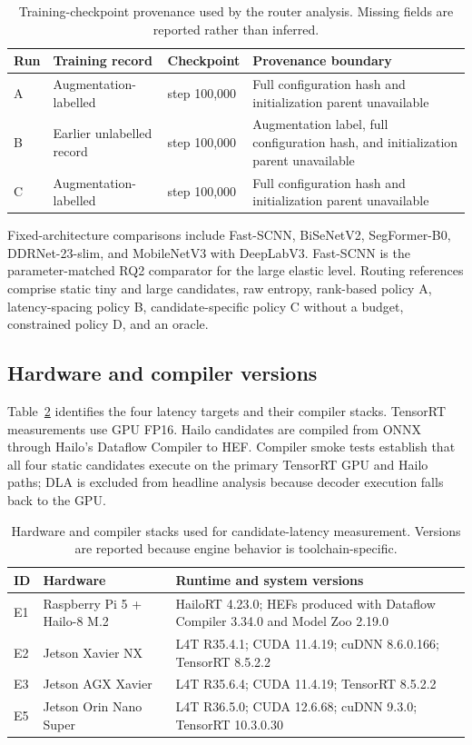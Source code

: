 \documentclass[a4paper,review,12pt]{elsarticle}
\begin{document}
\begin{table}[H]
\centering
\caption{Training-checkpoint provenance used by the router analysis. Missing fields are reported rather than inferred.}
\label{tab:provenance}
\small
\begin{tabularx}{\textwidth}{@{}l>{\raggedright\arraybackslash}p{}lX@{}}
\toprule
Run & Training record & Checkpoint & Provenance boundary \\
\midrule
A & Augmentation-labelled & step 100,000 & Full configuration hash and initialization parent unavailable \\
B & Earlier unlabelled record & step 100,000 & Augmentation label, full configuration hash, and initialization parent unavailable \\
C & Augmentation-labelled & step 100,000 & Full configuration hash and initialization parent unavailable \\
\bottomrule
\end{tabularx}
\end{table}

Fixed-architecture comparisons include Fast-SCNN, BiSeNetV2, SegFormer-B0, DDRNet-23-slim, and MobileNetV3 with DeepLabV3. Fast-SCNN is the parameter-matched RQ2 comparator for the large elastic level. Routing references comprise static tiny and large candidates, raw entropy, rank-based policy A, latency-spacing policy B, candidate-specific policy C without a budget, constrained policy D, and an oracle.

\subsection{Hardware and compiler versions}

Table~\ref{tab:hardware} identifies the four latency targets and their compiler stacks. TensorRT measurements use GPU FP16. Hailo candidates are compiled from ONNX through Hailo's Dataflow Compiler to HEF. Compiler smoke tests establish that all four static candidates execute on the primary TensorRT GPU and Hailo paths; DLA is excluded from headline analysis because decoder execution falls back to the GPU.

\begin{table}[H]
\centering
\caption{Hardware and compiler stacks used for candidate-latency measurement. Versions are reported because engine behavior is toolchain-specific.}
\label{tab:hardware}
\small
\begin{tabularx}{\textwidth}{@{}llX@{}}
\toprule
ID & Hardware & Runtime and system versions \\
\midrule
E1 & Raspberry Pi 5 + Hailo-8 M.2 & HailoRT 4.23.0; HEFs produced with Dataflow Compiler 3.34.0 and Model Zoo 2.19.0 \\
E2 & Jetson Xavier NX & L4T R35.4.1; CUDA 11.4.19; cuDNN 8.6.0.166; TensorRT 8.5.2.2 \\
E3 & Jetson AGX Xavier & L4T R35.6.4; CUDA 11.4.19; TensorRT 8.5.2.2 \\
E5 & Jetson Orin Nano Super & L4T R36.5.0; CUDA 12.6.68; cuDNN 9.3.0; TensorRT 10.3.0.30 \\
\bottomrule
\end{tabularx}
\end{table}
\end{document}
